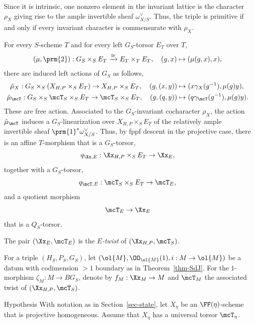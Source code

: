 Since it is intrinsic, one nonzero element in the invariant lattice is the character $\rho_X$ giving rise to the ample invertible sheaf $\omega^\vee_{X/S}$. Thus, the triple is primitive if and only if every invariant character is commensurate with $\rho_X$.

For every $S$-scheme $T$ and for every left $G_S$-torsor $E_T$ over $T$,
\[
(\mu,\prm{2}):G_S\times_S E_T \xrightarrow{\cong} E_T\times_T E_T,\quad (g,x)\mapsto (\mu(g,x),x),
\]
there are induced left actions of $G_S$ as follows,
\begin{align*}
\tilde{\mu}_X:G_S \times_S (X_{H,P}\times_S E_T) \to X_{H,P}\times_S E_T, \quad (g,(x,y)) &\mapsto (x\gamma_X(g^{-1}),\mu(g)y),
\\
\tilde{\mu}_\mcT:G_S \times_S \mcT_S\times_S E_T \to
\mcT_S\times_S E_T, \quad (g,(q,y))&\mapsto (q\gamma_\mcT(g^{-1}),\mu(g)y).
\end{align*}
These are free action. Associated to the $G_S$-invariant cocharacter $\rho_X$, the action $\tilde{\mu}_\mcT$ induces a $G_S$-linearization over $X_{H,P}\times_S E_T$ of the relatively ample invertible sheaf $\prm{1}^*\omega_{X/S}^\vee$. Thus, by fppf descent in the projective case, there is an affine $T$-morphism that is a $G_S$-torsor,
\[
q_{\Xx,E}: \Xx_{H,P}\times_S E_T \to \Xx_E,
\]
together with a $G_S$-torsor,
\[
q_{\mcT,E}:\mcT_S \times_S E_T \to \mcT_E,
\]
and a quotient morphism
\[
\mcT_E \to \Xx_E
\]
that is a $Q_S$-torsor.

\goodbreak
\begin{defi} \label{defn-twist}
The pair $(\Xx_E,\mcT_E)$ is the \emph{$E$-twist} of $(\Xx_{H,P},\mcT_S)$.
\end{defi}

\begin{nota}\label{notat-prim}
For a triple $(H_S,P_S,G_S)$, let $(\ol{M},\OO_{\ol{M}}(1), i:M\to \ol{M})$ be a datum with codimension $>1$ boundary as in Theorem~\ref{thm-SdJ}. For the $1$-morphism $\zeta_M:M\to BG_S$, denote by $f_M:\Xx_M \to M$ and $\mcT_M$ the associated twist of $(\Xx_{H,P},\mcT_S)$.
\end{nota}

\begin{enonce}
{Hypothesis} \label{hyp-group}
With notation as in Section~\ref{sec-state}, let $X_\eta$ be an $\FF(\eta)$-scheme that is projective homogeneous. Assume that $X_\eta$ has a universal torsor $\mcT_\eta$.
\end{enonce}

